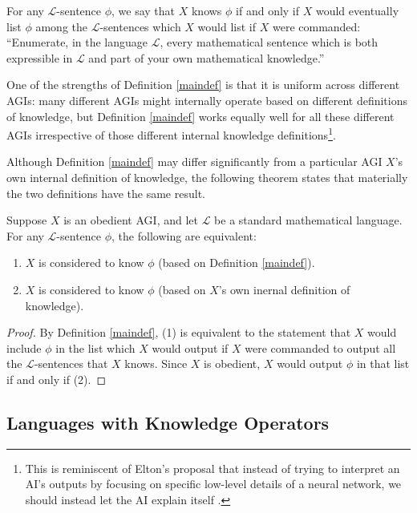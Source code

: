 \documentclass[runningheads]{llncs}
\begin{document}
\begin{definition}
\label{maindef}
  For any $\mathscr L$-sentence $\phi$, we say that $X$ knows $\phi$ if and only
  if $X$ would eventually list $\phi$ among the $\mathscr L$-sentences which $X$
  would list if $X$ were commanded:
  ``Enumerate, in the language $\mathscr L$, every mathematical sentence which
  is both expressible in $\mathscr L$ and part of your own mathematical knowledge.''
\end{definition}

One of the strengths of Definition \ref{maindef} is that it is uniform across
different AGIs: many different AGIs might internally operate based on different
definitions of knowledge, but Definition \ref{maindef} works equally well for
all these different AGIs irrespective of those different internal knowledge
definitions\footnote{This is reminiscent of Elton's proposal that instead of
trying to interpret an AI's outputs by focusing on specific low-level details
of a neural network, we should instead let the AI explain itself \cite{elton}.}.

Although Definition \ref{maindef} may differ significantly from a particular AGI
$X$'s own internal definition of knowledge, the following theorem states that
materially the two definitions have the same result.

\begin{theorem}
\label{sentenceequivalence}
  Suppose $X$ is an obedient AGI, and let $\mathscr L$
  be a standard mathematical language. For any $\mathscr L$-sentence $\phi$, the following
  are equivalent:
  \begin{enumerate}
    \item $X$ is
    considered to know $\phi$ (based on Definition \ref{maindef}).
    \item
    $X$ is considered to know $\phi$ (based on $X$'s own inernal definition of
    knowledge).
  \end{enumerate}
\end{theorem}

\begin{proof}
  By Definition \ref{maindef}, (1) is equivalent to the statement that $X$ would
  include $\phi$ in the list which $X$ would output if $X$ were commanded to output
  all the $\mathscr L$-sentences that $X$ knows. Since $X$ is obedient, $X$ would output
  $\phi$ in that list if and only if (2).
\end{proof}

\subsection{Languages with Knowledge Operators}
\end{document}
